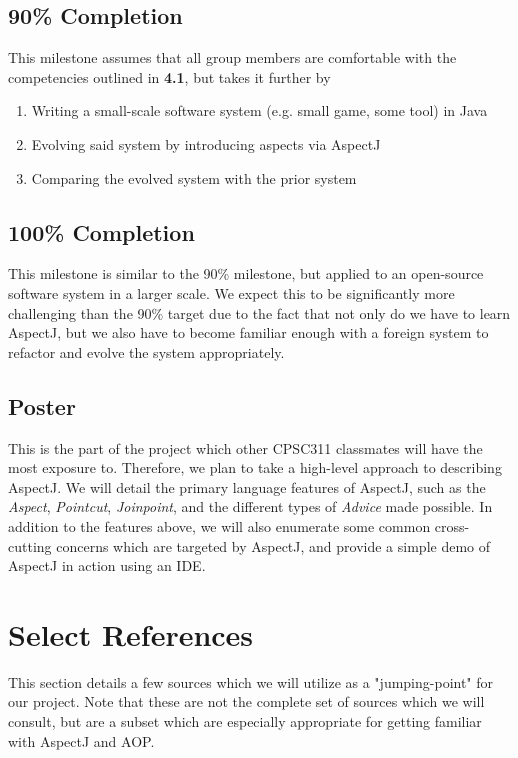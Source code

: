 \documentclass[sigconf]{acmart}
\begin{document}
\subsection{90\% Completion}
This milestone assumes that all group members are comfortable with the competencies outlined in \textbf{4.1}, but takes it further by
\begin{enumerate}
    \item Writing a small-scale software system (e.g. small game, some tool) in Java
    \item Evolving said system by introducing aspects via AspectJ
    \item Comparing the evolved system with the prior system
\end{enumerate}

\subsection{100\% Completion}
This milestone is similar to the 90\% milestone, but applied to an open-source software system in a larger scale. We expect this to be significantly more challenging than the 90\% target due to the fact that not only do we have to learn AspectJ, but we also have to become familiar enough with a foreign system to refactor and evolve the system appropriately.

\subsection{Poster}
This is the part of the project which other CPSC311 classmates will have the most exposure to. Therefore, we plan to take a high-level approach to describing AspectJ. We will detail the primary language features of AspectJ, such as the \textit{Aspect}, \textit{Pointcut}, \textit{Joinpoint}, and the different types of \textit{Advice} made possible. In addition to the features above, we will also enumerate some common cross-cutting concerns which are targeted by AspectJ, and provide a simple demo of AspectJ in action using an IDE.
\section{Select References}

This section details a few sources which we will utilize as a "jumping-point" for our project. Note that these are not the complete set of sources which we will consult, but are a subset which are especially appropriate for getting familiar with AspectJ and AOP.
\end{document}
